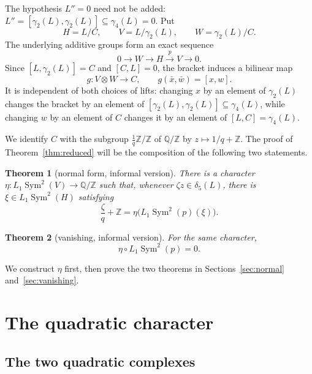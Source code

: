 \documentclass[11pt]{amsart}
\newtheorem{theorem}{Theorem}[section]
\theoremstyle{remark}
\newcommand{\Z}{\mathbb Z}
\newcommand{\Q}{\mathbb Q}
\newcommand{\Sym}{\operatorname{Sym}}
\newcommand{\gm}{\gamma}
\newcommand{\dlt}{\delta}
\begin{document}
The hypothesis $L''=0$ need not be added: $L''=[\gm_2(L),\gm_2(L)]
\subseteq\gm_4(L)=0$.  Put
\[
 H=L/C,
 \qquad V=L/\gm_2(L),
 \qquad W=\gm_2(L)/C.
\]
The underlying additive groups form an exact sequence
\begin{equation}\label{eq:extension}
             0\longrightarrow W\longrightarrow H
             \xrightarrow{p}V\longrightarrow0.
\end{equation}
Since $[L,\gm_2(L)]=C$ and $[C,L]=0$, the bracket induces a bilinear
map
\begin{equation}\label{eq:g}
 g:V\otimes W\longrightarrow C,
 \qquad g(\bar x,\bar w)=[x,w].
\end{equation}
It is independent of both choices of lifts: changing $x$ by an
element of $\gm_2(L)$ changes the bracket by an element of
$[\gm_2(L),\gm_2(L)]\subseteq\gm_4(L)$, while changing $w$ by an
element of $C$ changes it by an element of $[L,C]=\gm_4(L)$.

We identify $C$ with the subgroup $\frac1q\Z/\Z$ of $\Q/\Z$ by
$z\mapsto1/q+\Z$.  The proof of Theorem~\ref{thm:reduced} will be the
composition of the following two statements.

\begin{theorem}[normal form, informal version]\label{thm:nf-informal}
There is a character
$\eta:L_1\Sym^2(V)\to\Q/\Z$ such that, whenever
$\zeta z\in\dlt_5(L)$, there is
$\xi\in L_1\Sym^2(H)$ satisfying
\[
 \frac{\zeta}{q}+\Z
   =\eta\bigl(L_1\Sym^2(p)(\xi)\bigr).
\]
\end{theorem}

\begin{theorem}[vanishing, informal version]\label{thm:van-informal}
For the same character,
\[
                     \eta\circ L_1\Sym^2(p)=0.
\]
\end{theorem}

We construct $\eta$ first, then prove the two theorems in
Sections~\ref{sec:normal} and~\ref{sec:vanishing}.

\section{The quadratic character}

\subsection{The two quadratic complexes}
\end{document}
